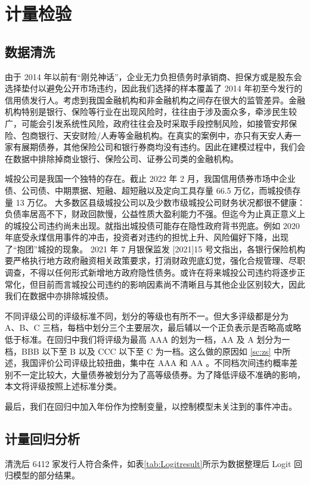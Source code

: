 
\chapter{计量检验}
\section{数据清洗}
由于 2014 年以前有“刚兑神话”，企业无力负担债务时承销商、担保方或是股东会选择垫付以避免公开市场违约，因此我们选择的样本覆盖了 2014 年初至今发行的信用债发行人。考虑到我国金融机构和非金融机构之间存在很大的监管差异。金融机构特别是银行、保险等行业在出现风险时，往往由于涉及面众多，牵涉民生较广，可能会引发系统性风险，政府往往会及时采取手段控制风险，如接管安邦保险、包商银行、天安财险/人寿等金融机构。在真实的案例中，亦只有天安人寿一家有展期债券，其他保险公司和银行券商均没有违约。因此在建模过程中，我们会在数据中排除掉商业银行、保险公司、证券公司类的金融机构。

城投公司是我国一个独特的存在。截止 2022 年 2 月，我国信用债券市场中企业债、公司债、中期票据、短融、超短融以及定向工具存量 66.5 万亿，而城投债存量 13 万亿。
大多数区县级城投公司以及少数市级城投公司财务状况都很不健康：负债率居高不下，财政回款慢，公益性质大盈利能力不强。但迄今为止真正意义上的城投公司违约尚未出现。\Textcite{钟辉勇2016城投债的担保可信吗}就指出城投债可能存在隐性政府背书兜底。例如 2020 年底受永煤信用事件的冲击，投资者对违约的担忧上升、风险偏好下降，出现了“抱团”城投的现象。
2021 年 7 月银保监发 [2021]15 号文指出，各银行保险机构要严格执行地方政府融资相关政策要求，打消财政兜底幻觉，强化合规管理、尽职调查，不得以任何形式新增地方政府隐性债务。或许在将来城投公司违约将逐步正常化，但目前而言城投公司违约的影响因素尚不清晰且与其他企业区别较大，因此我们在数据中亦排除城投债。

不同评级公司的评级标准不同，划分的等级也有所不一。但大多评级都是分为 A、B、C 三档，每档中划分三个主要层次，最后辅以一个正负表示是否略高或略低于标准。在回归中我们将评级为最高 AAA 的划为一档，AA 及 A 划分为一档，BBB 以下至 B 以及 CCC 以下至 C 为一档。这么做的原因如 \ref{sc:zs} 中所述，我国评价公司评级比较扭曲，集中在 AAA 和 AA 。不同档次间违约概率差别不一定比较大，大量债券被划分为了高等级债券。为了降低评级不准确的影响，本文将评级按照上述标准分类。

最后，我们在回归中加入年份作为控制变量，以控制模型未关注到的事件冲击。

\section{计量回归分析}
清洗后 6412 家发行人符合条件，如表\ref{tab:Logitresult}所示为数据整理后 Logit 回归模型的部分结果。

